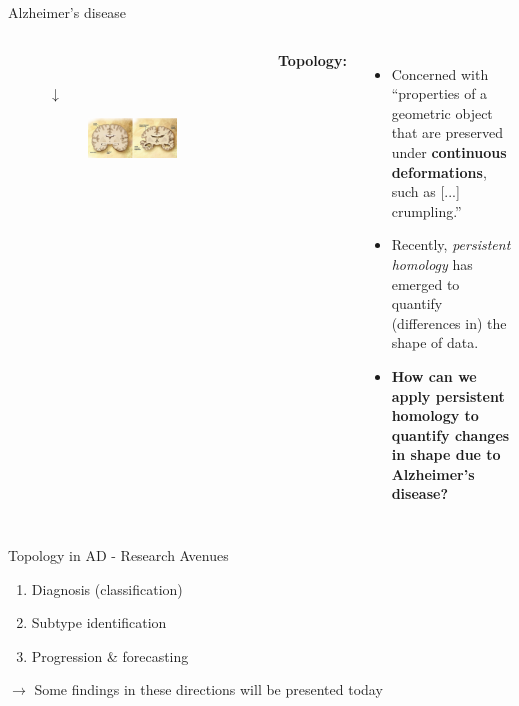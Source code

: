 \documentclass[aspectratio=169, 10pt, dvipsnames]{beamer}
\begin{document}
\begin{frame}[fragile]{Alzheimer's disease}
\begin{columns}[T,onlytextwidth]
{\begin{figure}
\begin{subfigure}{0.2\textwidth}
        \end{subfigure}\\
        \centering
        $\downarrow$\\
        \begin{subfigure}{\textwidth}
          \centering
          \includegraphics[width=\textwidth]{figures/AD_brain_comparison.jpg}
        \end{subfigure}
      \end{figure}
    }
    \textbf{Topology:} \doughnut \mug
    \begin{itemize}
     \item Concerned with ``properties of a geometric object that are preserved under \textbf{continuous deformations}, such as [...] crumpling.''
    \item Recently, \textit{persistent homology} has emerged to quantify (differences in) the shape of data.
    \item \textbf{How can we apply persistent homology to quantify changes in shape due to Alzheimer's disease?}
    \end{itemize}
    \end{columns}
\end{frame}


\begin{frame}[fragile]{Topology in AD - Research Avenues \compass}
  \begin{enumerate}
  \item Diagnosis (classification)
  \item Subtype identification
  \item Progression \& forecasting
  \end{enumerate}
$\rightarrow$ Some findings in these directions will be presented today
\end{frame}
\end{document}
